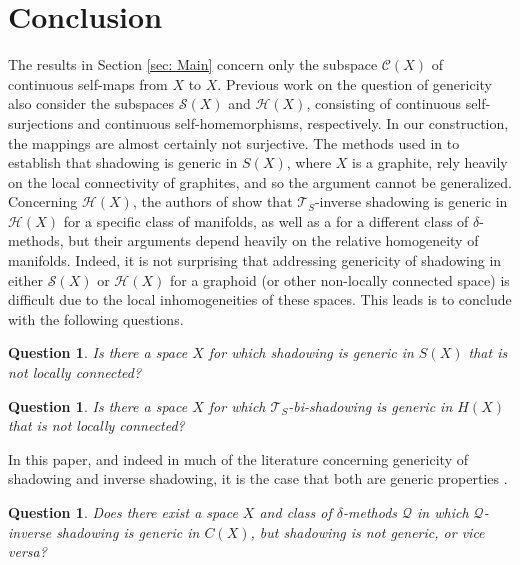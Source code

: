 \documentclass{amsart}
\newtheorem{question}[theorem]{Question}
\numberwithin{equation}{section}
\begin{document}
\section{Conclusion}
The results in Section \ref{sec: Main} concern only the subspace $\mathcal C(X)$ of continuous self-maps from $X$ to $X$. Previous work on the question of genericity also consider the subspaces $\mathcal S(X)$ and $\mathcal H(X)$, consisting of continuous self-surjections and continuous self-homemorphisms, respectively. In our construction, the mappings are almost certainly not surjective. The methods used in \cite{genericshadowingmeddaugh} to establish that shadowing is generic in $S(X)$, where $X$ is a graphite, rely heavily on the local connectivity of graphites, and so the argument cannot be generalized. Concerning $\mathcal H(X)$, the authors of \cite{Inverseshadowinggenericvarious} show that $\mathcal{T}_S$-inverse shadowing is generic in $\mathcal H(X)$ for a specific class of manifolds, as well as a for a different class of $\delta$-methods, but their arguments depend heavily on the relative homogeneity of manifolds. Indeed, it is not surprising that addressing genericity of shadowing in either $\mathcal S(X)$ or $\mathcal H(X)$ for a graphoid (or other non-locally connected space) is difficult due to the local inhomogeneities of these spaces. This leads is to conclude with the following questions.

\begin{question}
    Is there a space $X$ for which shadowing is generic in $S(X)$ that is not locally connected?
\end{question}


\begin{question}
    Is there a space $X$ for which $\mathcal{T}_S$-bi-shadowing is generic in $H(X)$ that is not locally connected?
\end{question}

In this paper, and indeed in much of the literature concerning genericity of shadowing and inverse shadowing, it is the case that both are generic properties \cite{Inverseshadowinggenericvarious, genericshadowingmeddaugh, yano1987generic}.

\begin{question}
    Does there exist a space $X$ and class of $\delta$-methods $\mathcal{Q}$ in which $\mathcal{Q}$-inverse shadowing is generic in $C(X)$, but shadowing is not generic, or vice versa?
\end{question}







\end{document}

